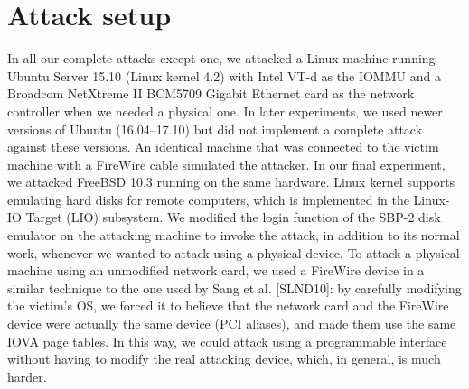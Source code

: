 \section{Attack setup}
In all our complete attacks except one, we attacked a Linux machine running Ubuntu Server 15.10 (Linux kernel 4.2) with Intel VT-d as the IOMMU and a Broadcom NetXtreme II BCM5709 Gigabit Ethernet card as the network controller when we needed a physical one. In later experiments, we used newer versions of Ubuntu (16.04–17.10) but did not implement a complete attack against these versions. An identical machine that was connected to the victim machine with a FireWire cable simulated the attacker. In our final experiment, we attacked FreeBSD 10.3 running on the same hardware.  Linux kernel supports emulating hard disks for remote computers, which is implemented in the Linux-IO Target (LIO) subsystem. We modified the login function of the SBP-2 disk emulator on the attacking machine to invoke the attack, in addition to its normal work, whenever we wanted to attack using a physical device.
To attack a physical machine using an unmodified network card, we used a FireWire device in a similar technique to the one used by Sang et al. [SLND10]: by carefully modifying the victim’s OS, we forced it to believe that the network card and the FireWire device were actually the same device (PCI aliases), and made them use the same IOVA page tables. In this way, we could attack using a programmable interface without having to modify the real attacking device, which, in general, is much harder.
